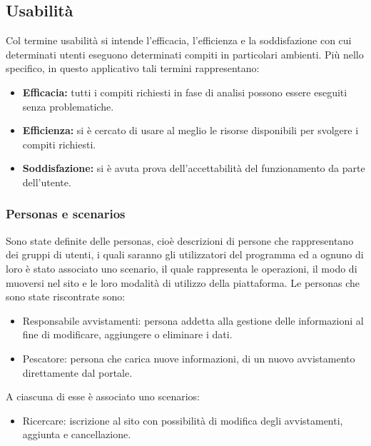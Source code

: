 \documentclass[a4paper,final,12pt]{report}
\begin{document}
\subsection{Usabilità}
Col termine usabilità si intende l'efficacia, l'efficienza e la soddisfazione con cui determinati utenti eseguono determinati compiti in particolari ambienti. 
Più nello specifico, in questo applicativo tali termini rappresentano:
\begin{itemize}
\item \textbf{Efficacia:} tutti i compiti richiesti in fase di analisi possono essere eseguiti senza problematiche.
\item \textbf{Efficienza:} si è cercato di usare al meglio le risorse disponibili per svolgere i compiti richiesti.
\item \textbf{Soddisfazione:} si è avuta prova dell'accettabilità del funzionamento da parte dell'utente.
\end{itemize}

\subsubsection{Personas e scenarios}
Sono state definite delle personas, cioè descrizioni di persone che rappresentano dei gruppi di utenti, i quali saranno gli utilizzatori del programma ed a ognuno di loro è stato associato uno scenario, il quale rappresenta le operazioni, il modo di muoversi nel sito e le loro modalità di utilizzo della piattaforma.
Le personas che sono state riscontrate sono:
\begin{itemize}
 \item Responsabile avvistamenti: persona addetta alla gestione delle informazioni al fine di modificare, aggiungere o eliminare i dati. 
\item Pescatore: persona che carica nuove informazioni, di un nuovo avvistamento direttamente dal portale.
 \end{itemize} 
 A ciascuna di esse è associato uno scenarios:
 \begin{itemize}
 \item Ricercare: iscrizione al sito con possibilità di modifica degli avvistamenti, aggiunta e cancellazione.
 \end{itemize}
\end{document}
